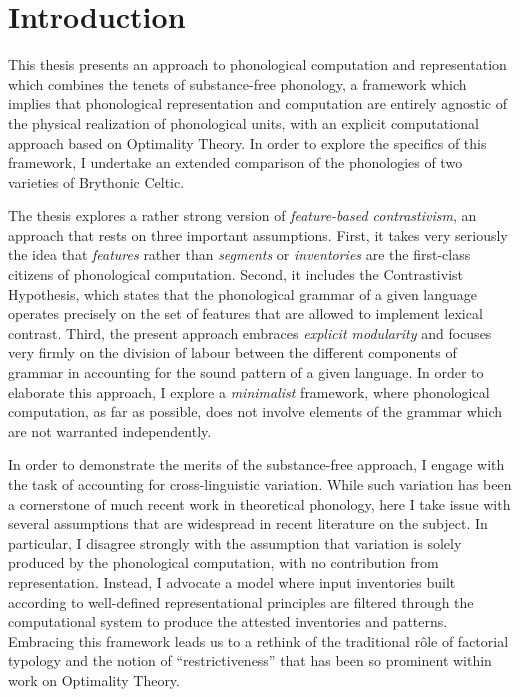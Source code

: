 \chapter{Introduction}
\label{cha:introduction}

This thesis presents an approach to phonological computation and representation which combines the tenets of substance\hyp free phonology, a framework which implies that phonological representation and computation are entirely agnostic of the physical realization of phonological units, with an explicit computational approach based on Optimality Theory. In order to explore the specifics of this framework, I undertake an extended comparison of the phonologies of two varieties of Brythonic Celtic.

The thesis explores a rather strong version of \emph{feature-based contrastivism}, an approach that rests on three important assumptions. First, it takes very seriously the idea that \emph{features} rather than \emph{segments} or \emph{inventories} are the first-class citizens of phonological computation. Second, it  includes the Contrastivist Hypothesis, which states that the phonological grammar of a given language operates precisely on the set of features that are allowed to implement lexical contrast. Third, the present approach embraces \emph{explicit modularity} and focuses very firmly on the division of labour between the different components of grammar in accounting for the sound pattern of a given language. In order to elaborate this approach, I explore a \emph{minimalist} framework, where phonological computation, as far as possible, does not involve elements of the grammar which are not warranted independently.

In order to demonstrate the merits of the substance\hyp free approach, I engage with the task of accounting for cross\hyp linguistic variation. While such variation has been a cornerstone of much recent work in theoretical phonology, here I take issue with several assumptions that are widespread in recent literature on the subject. In particular, I disagree strongly with the assumption that variation is solely produced by the phonological computation, with no contribution from representation. Instead, I advocate a model where input inventories built according to well-defined representational principles are filtered through the computational system to produce the attested inventories and patterns. Embracing this framework leads us to a rethink of the traditional rôle of factorial typology and the notion of \enquote{restrictiveness} that has been so prominent within work on Optimality Theory.

